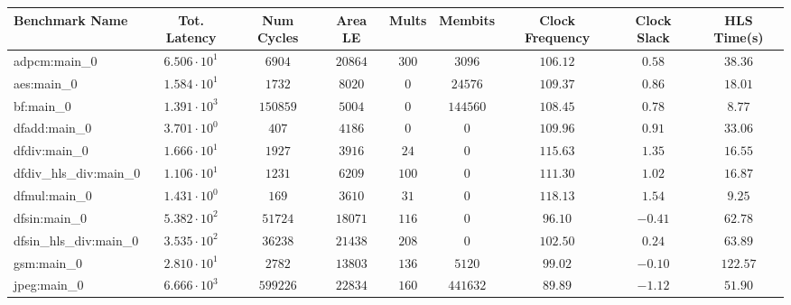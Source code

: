 \begin{tabular}{|l|c|c|c|c|c|c|c|c|}
\hline
Benchmark Name          & Tot. Latency           & Num Cycles & Area LE    & Mults    & Membits    & Clock Frequency & Clock Slack & HLS Time(s) \\
\hline
adpcm:main\_0           & $ 6.506 \cdot 10^{1} $ & $ 6904   $ & $ 20864  $ & $ 300  $ & $ 3096   $ & $ 106.12      $ & $ 0.58    $ & $ 38.36   $ \\
aes:main\_0             & $ 1.584 \cdot 10^{1} $ & $ 1732   $ & $ 8020   $ & $ 0    $ & $ 24576  $ & $ 109.37      $ & $ 0.86    $ & $ 18.01   $ \\
bf:main\_0              & $ 1.391 \cdot 10^{3} $ & $ 150859 $ & $ 5004   $ & $ 0    $ & $ 144560 $ & $ 108.45      $ & $ 0.78    $ & $ 8.77    $ \\
dfadd:main\_0           & $ 3.701 \cdot 10^{0} $ & $ 407    $ & $ 4186   $ & $ 0    $ & $ 0      $ & $ 109.96      $ & $ 0.91    $ & $ 33.06   $ \\
dfdiv:main\_0           & $ 1.666 \cdot 10^{1} $ & $ 1927   $ & $ 3916   $ & $ 24   $ & $ 0      $ & $ 115.63      $ & $ 1.35    $ & $ 16.55   $ \\
dfdiv\_hls\_div:main\_0 & $ 1.106 \cdot 10^{1} $ & $ 1231   $ & $ 6209   $ & $ 100  $ & $ 0      $ & $ 111.30      $ & $ 1.02    $ & $ 16.87   $ \\
dfmul:main\_0           & $ 1.431 \cdot 10^{0} $ & $ 169    $ & $ 3610   $ & $ 31   $ & $ 0      $ & $ 118.13      $ & $ 1.54    $ & $ 9.25    $ \\
dfsin:main\_0           & $ 5.382 \cdot 10^{2} $ & $ 51724  $ & $ 18071  $ & $ 116  $ & $ 0      $ & $ 96.10       $ & $ -0.41   $ & $ 62.78   $ \\
dfsin\_hls\_div:main\_0 & $ 3.535 \cdot 10^{2} $ & $ 36238  $ & $ 21438  $ & $ 208  $ & $ 0      $ & $ 102.50      $ & $ 0.24    $ & $ 63.89   $ \\
gsm:main\_0             & $ 2.810 \cdot 10^{1} $ & $ 2782   $ & $ 13803  $ & $ 136  $ & $ 5120   $ & $ 99.02       $ & $ -0.10   $ & $ 122.57  $ \\
jpeg:main\_0            & $ 6.666 \cdot 10^{3} $ & $ 599226 $ & $ 22834  $ & $ 160  $ & $ 441632 $ & $ 89.89       $ & $ -1.12   $ & $ 51.90   $ \\

\end{tabular}
